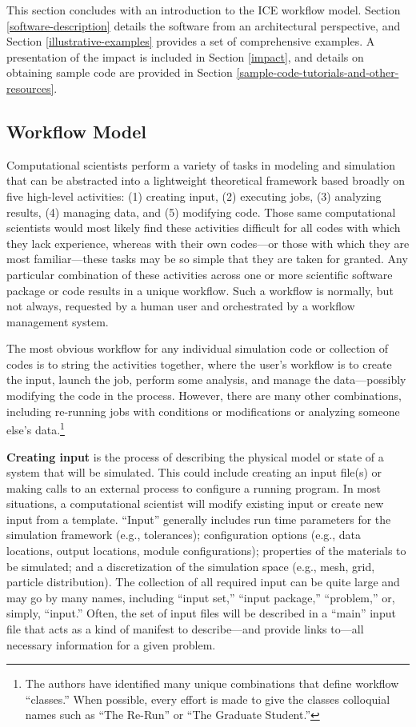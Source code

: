 This section concludes with an introduction to the ICE workflow model. Section \ref{software-description} details the software
from an architectural perspective, and Section \ref{illustrative-examples}
provides a set of comprehensive examples. A
presentation of the impact is included in Section \ref{impact}, and details on obtaining sample 
code are provided in Section \ref{sample-code-tutorials-and-other-resources}.

\subsection{Workflow Model}\label{workflow-model}

Computational scientists perform a variety of tasks in modeling and
simulation that can be abstracted into a lightweight theoretical
framework based broadly on five high-level activities: (1)
creating input, (2) executing jobs, (3) analyzing results, (4) managing
data, and (5) modifying code. Those same computational scientists would
most likely find these activities difficult for all codes with which
they lack experience, whereas with their own codes---or those with which
they are most familiar---these tasks may be so simple that they are
taken for granted. Any particular combination of these activities across
one or more scientific software package or code results in a unique
workflow. Such a workflow is normally, but not always, requested
by a human user and orchestrated by a workflow management system.

The most obvious workflow for any individual simulation code or
collection of codes is to string the activities together, where the user's
workflow is to create the input, launch the job, perform some analysis,
and manage the data---possibly modifying the code in the process. However, 
there are many other combinations, including re-running jobs with
conditions or modifications or analyzing someone else's data.\footnote{The
authors have identified many unique combinations that
define workflow ``classes.'' When possible, every effort is made to give the
classes colloquial names such as ``The Re-Run'' or ``The Graduate Student.''}

\textbf{Creating input} is the process of describing the physical model
or state of a system that will be simulated. This could include creating
an input file(s) or making calls to an external process to configure a
running program. In most situations, a computational scientist will
modify existing input or create new input from a template. ``Input''
generally includes run time parameters for the simulation framework
(e.g., tolerances); configuration options (e.g., data locations, output
locations, module configurations); properties of the materials to be
simulated; and a discretization of the simulation space (e.g., mesh,
grid, particle distribution). The collection of all required input can
be quite large and may go by many names, including ``input set,''
``input package,'' ``problem,'' or, simply, ``input.'' Often, the set of
input files will be described in a ``main'' input file that acts as a
kind of manifest to describe---and provide links to---all necessary
information for a given problem.

